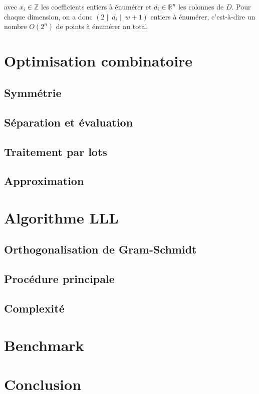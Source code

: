 \documentclass{article}
\begin{document}
avec $x_i \in \mathbb{Z}$ les coefficients entiers à énumérer et $d_i \in \mathbb{R}^n$ les colonnes de $D$. Pour chaque dimension, on a donc $(2 \lVert d_i \rVert w + 1)$ entiers à énumérer, c'est-à-dire un nombre $O(2^n)$ de points à énumérer au total.

\section{Optimisation combinatoire}

\subsection{Symmétrie}

\subsection{Séparation et évaluation}

\subsection{Traitement par lots}

\subsection{Approximation}

\section{Algorithme LLL}

\subsection{Orthogonalisation de Gram-Schmidt}

\subsection{Procédure principale}

\subsection{Complexité}

\section{Benchmark}

\section{Conclusion}

\newpage

\end{document}

